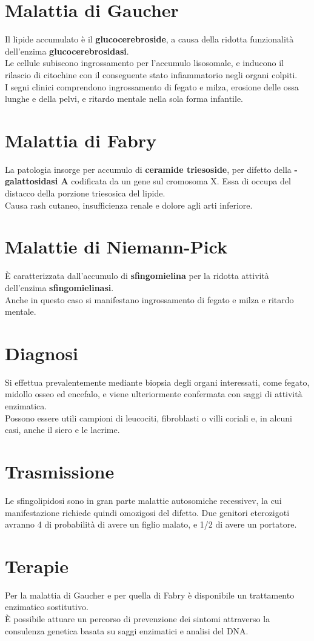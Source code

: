 \documentclass[a4paper, 12pt]{article}
\begin{document}
\section{Malattia di Gaucher}
Il lipide accumulato è il \textbf{glucocerebroside}, a causa della ridotta funzionalità dell'enzima \textbf{glucocerebrosidasi}.\\
Le cellule subiscono ingrossamento per l'accumulo lisosomale, e inducono il rilascio di citochine con il conseguente stato infiammatorio negli organi colpiti.\\
I segni clinici comprendono ingrossamento di fegato e milza, erosione delle ossa lunghe e della pelvi, e ritardo mentale nella sola forma infantile.

\section{Malattia di Fabry}
La patologia insorge per accumulo di \textbf{ceramide triesoside}, per difetto della \textbf{\textalpha-galattosidasi A} codificata da un gene sul cromosoma X. Essa di occupa del distacco della porzione triesosica del lipide.\\
Causa rash cutaneo, insufficienza renale e dolore agli arti inferiore.

\section{Malattie di Niemann-Pick}
È caratterizzata dall'accumulo di \textbf{sfingomielina} per la ridotta attività dell'enzima \textbf{sfingomielinasi}.\\
Anche in questo caso si manifestano ingrossamento di fegato e milza e ritardo mentale.

\section{Diagnosi}
Si effettua prevalentemente mediante biopsia degli organi interessati, come fegato, midollo osseo ed encefalo, e viene ulteriormente confermata con saggi di attività enzimatica.\\
Possono essere utili campioni di leucociti, fibroblasti o villi coriali e, in alcuni casi, anche il siero e le lacrime.

\section{Trasmissione}
Le sfingolipidosi sono in gran parte malattie autosomiche recessivev, la cui manifestazione richiede quindi omozigosi del difetto. Due genitori eterozigoti avranno \/4 di probabilità di avere un figlio malato, e 1/2 di avere un portatore.

\section{Terapie}
Per la malattia di Gaucher e per quella di Fabry è disponibile un trattamento enzimatico sostitutivo.\\
È possibile attuare un percorso di prevenzione dei sintomi attraverso la consulenza genetica basata su saggi enzimatici e analisi del DNA.
\end{document}
